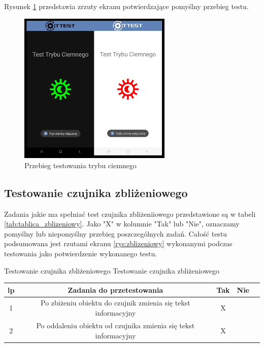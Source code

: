 Rysunek \ref{rys:ciemny} przedstawia zrzuty ekranu potwierdzające pomyślny przebieg testu.

\begin{figure}[!hbt]
	\begin{center}
		\includegraphics[angle=360, width=0.65\textwidth]{rys/punkt5/ciemny.jpg}
		\caption{Przebieg testowania trybu ciemnego}
		\label{rys:ciemny}
	\end{center}
\end{figure}   

\newpage


\subsection{Testowanie czujnika zbliżeniowego}

\hspace{0.60cm}Zadania jakie ma spełniać test czujnika zbliżeniiowego przedstawione są w tabeli \ref{tab:tablica_zblizeniowy}. Jako "X" w kolumnie "Tak" lub "Nie", oznaczamy pomyślny lub niepomyślny przebieg poszczególnych zadań. Całość testu podsumowana jest rzutami ekranu \ref{rys:zblizeniowy} wykonanymi podczas testowania jako potwierdzenie wykonanego testu.

\begin{tabela}
	{Testowanie czujnika zbliżeniowego}	%
	{Testowanie czujnika zbliżeniowego}	%
	{
		\begin{tabular}{|c|c|c|c|c|} \hline
			\textbf{lp} & \textbf{Zadania do przetestowania} & \textbf{Tak} & \textbf{Nie} \\ \hline
			1 & Po zbiżeniu obiektu do czujnik zmienia się tekst informacyjny  & X & ~ \\ \hline
			2 & Po oddaleniu obiektu od czujnika zmienia się tekst informacyjny & X & ~ \\ \hline
	\end{tabular}	}
	\label{tab:tablica_zblizeniowy}
\end{tabela}

